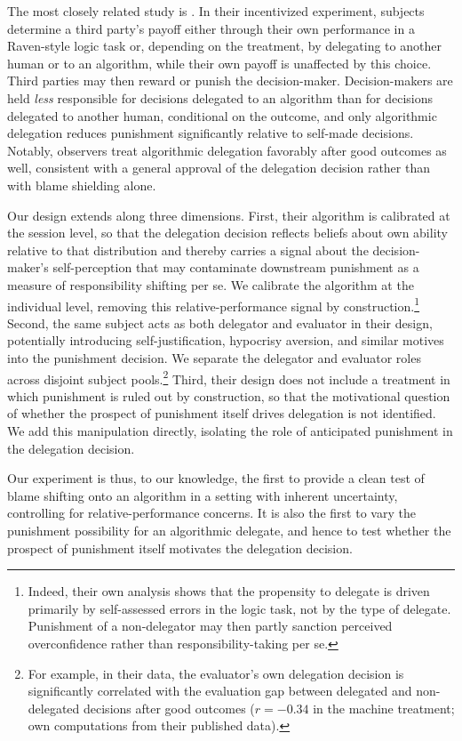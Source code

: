 The most closely related study is \citet{feier_hiding_2022}. In their incentivized experiment, subjects determine a third party's payoff either through their own performance in a Raven-style logic task or, depending on the treatment, by delegating to another human or to an algorithm, while their own payoff is unaffected by this choice. Third parties may then reward or punish the decision-maker. Decision-makers are held \textit{less} responsible for decisions delegated to an algorithm than for decisions delegated to another human, conditional on the outcome, and only algorithmic delegation reduces punishment significantly relative to self-made decisions. Notably, observers treat algorithmic delegation favorably after good outcomes as well, consistent with a general approval of the delegation decision rather than with blame shielding alone.

Our design extends \citet{feier_hiding_2022} along three dimensions. First, their algorithm is calibrated at the session level, so that the delegation decision reflects beliefs about own ability relative to that distribution and thereby carries a signal about the decision-maker's self-perception that may contaminate downstream punishment as a measure of responsibility shifting per se. We calibrate the algorithm at the individual level, removing this relative-performance signal by construction.\footnote{Indeed, their own analysis shows that the propensity to delegate is driven primarily by self-assessed errors in the logic task, not by the type of delegate. Punishment of a non-delegator may then partly sanction perceived overconfidence rather than responsibility-taking per se.} Second, the same subject acts as both delegator and evaluator in their design, potentially introducing self-justification, hypocrisy aversion, and similar motives into the punishment decision. We separate the delegator and evaluator roles across disjoint subject pools.\footnote{For example, in their data, the evaluator's own delegation decision is significantly correlated with the evaluation gap between delegated and non-delegated decisions after good outcomes ($r=-0.34$ in the machine treatment; own computations from their published data).} Third, their design does not include a treatment in which punishment is ruled out by construction, so that the motivational question of whether the prospect of punishment itself drives delegation is not identified. We add this manipulation directly, isolating the role of anticipated punishment in the delegation decision.

Our experiment is thus, to our knowledge, the first to provide a clean test of blame shifting onto an algorithm in a setting with inherent uncertainty, controlling for relative-performance concerns. It is also the first to vary the punishment possibility for an algorithmic delegate, and hence to test whether the prospect of punishment itself motivates the delegation decision.
